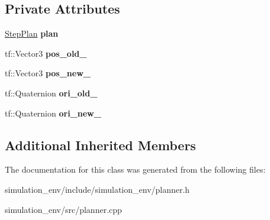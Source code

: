 \subsection*{Private Attributes}
\begin{DoxyCompactItemize}
\item 
\hyperlink{structStepResposePlanner_1_1StepPlan}{Step\+Plan} {\bfseries plan}\hypertarget{classStepResposePlanner_ac3fb95c79f21607429d8b6bd39e46451}{}\label{classStepResposePlanner_ac3fb95c79f21607429d8b6bd39e46451}

\item 
tf\+::\+Vector3 {\bfseries pos\+\_\+old\+\_\+}\hypertarget{classStepResposePlanner_a071fe84deb0d5fef56137d954cc3b98c}{}\label{classStepResposePlanner_a071fe84deb0d5fef56137d954cc3b98c}

\item 
tf\+::\+Vector3 {\bfseries pos\+\_\+new\+\_\+}\hypertarget{classStepResposePlanner_a201263730eb30540bb8ebdfae2548fc2}{}\label{classStepResposePlanner_a201263730eb30540bb8ebdfae2548fc2}

\item 
tf\+::\+Quaternion {\bfseries ori\+\_\+old\+\_\+}\hypertarget{classStepResposePlanner_a2bf8a7e217249ea9f8ecfb31d13bde7d}{}\label{classStepResposePlanner_a2bf8a7e217249ea9f8ecfb31d13bde7d}

\item 
tf\+::\+Quaternion {\bfseries ori\+\_\+new\+\_\+}\hypertarget{classStepResposePlanner_a6d30759d611861e771bc30116bda63af}{}\label{classStepResposePlanner_a6d30759d611861e771bc30116bda63af}

\end{DoxyCompactItemize}
\subsection*{Additional Inherited Members}


The documentation for this class was generated from the following files\+:\begin{DoxyCompactItemize}
\item 
simulation\+\_\+env/include/simulation\+\_\+env/planner.\+h\item 
simulation\+\_\+env/src/planner.\+cpp\end{DoxyCompactItemize}
